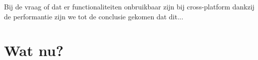 Bij de vraag of dat er functionaliteiten onbruikbaar zijn bij cross-platform dankzij de performantie 
zijn we tot de conclusie gekomen dat dit...

\section{Wat nu?}






